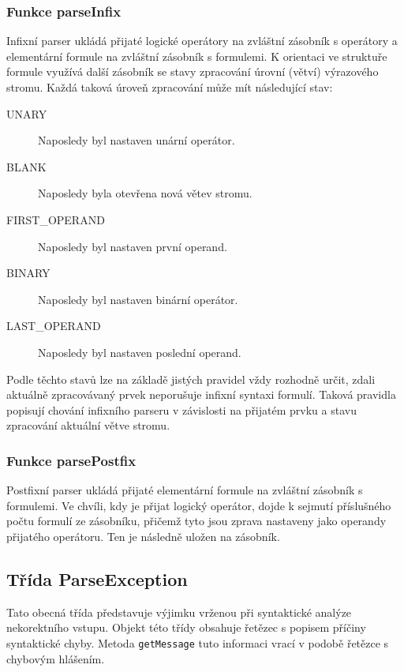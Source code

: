 \documentclass[thesis=B,czech,hidelinks]{thesis}[2012/06/26]
\begin{document}
\subsubsection{Funkce parseInfix}

Infixní parser ukládá přijaté logické operátory na zvláštní zásobník s operátory a elementární formule na zvláštní zásobník s formulemi. K orientaci ve struktuře formule využívá další zásobník se stavy zpracování úrovní (větví) výrazového stromu. Každá taková úroveň zpracování může mít následující stav:

\begin{description}
\item[UNARY] Naposledy byl nastaven unární operátor. 
\item[BLANK] Naposledy byla otevřena nová větev stromu.
\item[FIRST_OPERAND] Naposledy byl nastaven první operand.
\item[BINARY] Naposledy byl nastaven binární operátor.
\item[LAST_OPERAND] Naposledy byl nastaven poslední operand.
\end{description}

Podle těchto stavů lze na základě jistých pravidel vždy rozhodně určit, zdali aktuálně zpracovávaný prvek neporušuje infixní syntaxi formulí. Taková pravidla popisují chování infixního parseru v závislosti na přijatém prvku a stavu zpracování aktuální větve stromu.

\subsubsection{Funkce parsePostfix}

Postfixní parser ukládá přijaté elementární formule na zvláštní zásobník s formulemi. Ve chvíli, kdy je přijat logický operátor, dojde k sejmutí příslušného počtu formulí ze zásobníku, přičemž tyto jsou zprava nastaveny jako operandy přijatého operátoru. Ten je následně uložen na zásobník.

\subsection{Třída ParseException}

Tato obecná třída představuje výjimku vrženou při syntaktické analýze nekorektního vstupu. Objekt této třídy obsahuje řetězec s popisem příčiny syntaktické chyby. Metoda \texttt{getMessage} tuto informaci vrací v podobě řetězce s chybovým hlášením.
\end{document}
